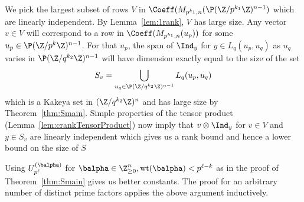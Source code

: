 We pick the largest subset of rows $V$ in $\Coeff(M_{p^{k_1},n}(\P (\Z/p^{k_1}\Z)^{n-1})$ which are linearly independent. By Lemma~\ref{lem:1rank}, $V$ has large size. Any vector $v\in V$ will correspond to a row in $\Coeff(M_{p^{k_1},n}(u_p))$ for some $u_p\in \P (\Z/p^k\Z)^{n-1}$. For that $u_p$, the span of $\Ind_y$ for $y\in L_q(u_p,u_q)$ as $u_q$ varies in $\P (\Z/q^{k_2}\Z)^{n-1} $ will have dimension exactly equal to the size of the set 
$$S_v=\bigcup\limits_{u_q\in \P (\Z/q^{k_2}\Z)^{n-1} } L_q(u_p,u_q)$$ 
which is a Kakeya set in $(\Z/q^{k_2}\Z)^n$ and has large size by Theorem~\ref{thm:Smain}. Simple properties of the tensor product (Lemma~\ref{lem:crankTensorProduct}) now imply that $v\otimes \Ind_y$ for $v\in V$ and $y\in S_v$ are linearly independent which gives us a rank bound and hence a lower bound on the size of $S$

Using $U^{(\balpha)}_{p^\ell}$ for $\balpha\in \Z_{\ge 0}^n,\text{wt}(\balpha)<p^{\ell-k}$ as in the proof of Theorem~\ref{thm:Smain} gives us better constants. The proof for an arbitrary number of distinct prime factors applies the above argument inductively.



